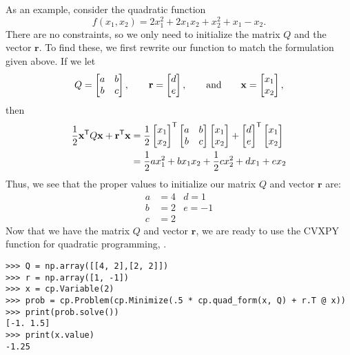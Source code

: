 As an example, consider the quadratic function
\[
f(x_1,x_2) = 2x_1^2 +2x_1x_2 + x_2^2 +x_1 -x_2.
\]
There are no constraints, so we only need to initialize the matrix $Q$ and the vector $\mathbf{r}$.
To find these, we first rewrite our function to match the formulation given above.
If we let
\[
Q = \begin{bmatrix}
  a & b\\
  b & c
\end{bmatrix}, \qquad
\mathbf{r} = \begin{bmatrix}
  d\\
  e
\end{bmatrix},
\qquad \text{and} \qquad
\mathbf{x} = \begin{bmatrix}
  x_1\\
  x_2
\end{bmatrix},
\]
then
\begin{align*}
\frac{1}{2}\mathbf{x}^{\mathsf T} Q\mathbf{x} + \mathbf{r}^{\mathsf T} \mathbf{x} &=
\frac{1}{2}
\begin{bmatrix}
  x_1\\
  x_2
\end{bmatrix}^{\mathsf T}
\begin{bmatrix}
  a & b\\
  b & c
\end{bmatrix}
\begin{bmatrix}
  x_1\\
  x_2
\end{bmatrix} +
\begin{bmatrix}
  d\\
  e
\end{bmatrix}^{\mathsf T}
\begin{bmatrix}
  x_1\\
  x_2
\end{bmatrix} \\
&= \frac{1}{2}ax_1^2 + bx_1x_2 + \frac{1}{2}cx_2^2 + dx_1 + ex_2
\end{align*}
Thus, we see that the proper values to initialize our matrix $Q$ and vector $\mathbf{r}$ are:
\begin{align*}
a &= 4  &d = 1 \\
b &= 2  &e = -1 \\
c &= 2
\end{align*}
Now that we have the matrix $Q$ and vector $\mathbf{r}$, we are ready to use the CVXPY function for quadratic programming, .
\begin{lstlisting}
>>> Q = np.array([[4, 2],[2, 2]])
>>> r = np.array([1, -1])
>>> x = cp.Variable(2)
>>> prob = cp.Problem(cp.Minimize(.5 * cp.quad_form(x, Q) + r.T @ x))
>>> print(prob.solve())
[-1. 1.5]
>>> print(x.value)
-1.25
\end{lstlisting}

